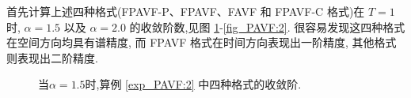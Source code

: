 	首先计算上述四种格式(FPAVF-P、FPAVF、FAVF 和 FPAVF-C 格式)在 $T=1$ 时, $\alpha=1.5$ 以及 $\alpha=2.0$ 的收敛阶数,见图 \ref{fig_PAVF:1}-\ref{fig_PAVF:2}.
	很容易发现这四种格式在空间方向均具有谱精度, 而 FPAVF 格式在时间方向表现出一阶精度, 其他格式则表现出二阶精度.
	
	\begin{figure}[H]
		\begin{center}
		\caption{当$\alpha=1.5$时,算例 \ref{exp_PAVF:2} 中四种格式的收敛阶.}
		 \label{fig_PAVF:1}
		\end{center}
		\end{figure}
		
